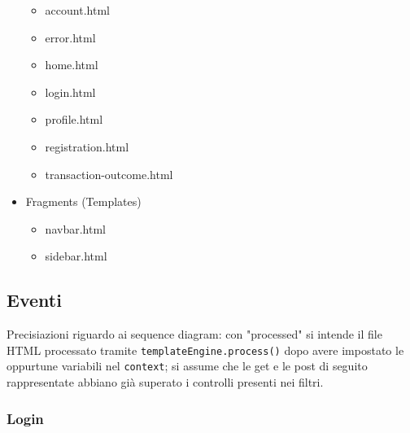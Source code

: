 \documentclass{article}
\begin{document}
\begin{itemize}
\begin{itemize}
		\item account.html
		\item error.html
		\item home.html
		\item login.html
		\item profile.html
		\item registration.html
		\item transaction-outcome.html
	\end{itemize}
	\item Fragments (Templates)
	\begin{itemize}
		\item navbar.html
		\item sidebar.html
	\end{itemize}
\end{itemize}

\subsection{Eventi}
Precisiazioni riguardo ai sequence diagram: con "processed" si intende il file HTML processato tramite \texttt{templateEngine.process()} dopo avere impostato le oppurtune variabili nel \texttt{context}; si assume che le get e le post di seguito rappresentate abbiano già superato i controlli presenti nei filtri.
\subsubsection{Login}
\end{document}
